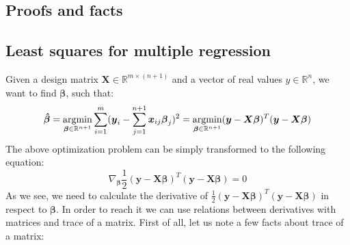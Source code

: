 \begin{appendices}

\chapter{Proofs and facts}

\section{Least squares for multiple regression}
\label{app:least}

Given a design matrix $\boldsymbol{X} \in \mathbb{R}^{m \times (n+1)}$ and a vector of real values $y \in \mathbb{R}^{n}$, we want to find $\boldsymbol{\beta}$, such that:
\begin{equation}
    \boldsymbol{\hat{\beta}} = \operatorname*{argmin}_{\boldsymbol{\beta} \in \mathbb{R}^{n+1}}\sum\limits_{i=1}^{m}(\boldsymbol{y}_i-\sum\limits_{j=1}^{n+1}\boldsymbol{x}_{ij}\boldsymbol{\beta}_j)^2 = \operatorname*{argmin}_{\boldsymbol{\beta} \in \mathbb{R}^{n+1}}(\boldsymbol{y}-\boldsymbol{X}\boldsymbol{\beta})^T(\boldsymbol{y}-\boldsymbol{X}\boldsymbol{\beta})
\end{equation}
The above optimization problem can be simply transformed to the following equation:
\begin{equation}\label{eq:least1}
    \nabla_{\boldsymbol{\beta}} \frac{1}{2}(\boldsymbol{y}-\boldsymbol{X}\boldsymbol{\beta})^T(\boldsymbol{y}-\boldsymbol{X}\boldsymbol{\beta}) = 0
\end{equation}
As we see, we need to calculate the derivative of $\frac{1}{2}(\boldsymbol{y}-\boldsymbol{X}\boldsymbol{\beta})^T(\boldsymbol{y}-\boldsymbol{X}\boldsymbol{\beta})$ in respect to $\boldsymbol{\beta}$. In order to reach it we can use relations between derivatives with matrices and trace of a matrix. First of all, let us note a few facts about trace of a matrix:


\end{appendices}
